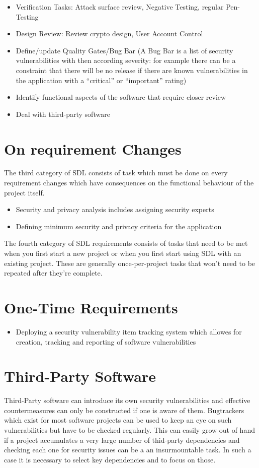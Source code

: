 \begin{itemize}
	\item Verification Tasks: Attack surface review, Negative Testing, regular Pen-Testing
	\item Design Review: Review crypto design, User Account Control
	\item Define/update Quality Gates/Bug Bar (A Bug Bar is a list of security vulnerabilities with then according severity: for example there can be a constraint that there will be no release if there are known vulnerabilities in the application with a ``critical'' or ``important'' rating)
	\item Identify functional aspects of the software that require closer review
	\item Deal with third-party software
\end{itemize}

\section{On requirement Changes}

The third category of SDL consists of task which must be done on every requirement changes which have consequences on the functional behaviour of the project itself. 

\begin{itemize}
	\item Security and privacy analysis includes assigning security experts
	\item Defining minimum security and privacy criteria for the application
\end{itemize}

The fourth category of SDL requirements consists of tasks that need to be met when you first start a new project or when you first start using SDL with an existing project. These are generally once-per-project tasks that won’t need to be repeated after they’re complete.

\section{One-Time Requirements}
\begin{itemize}
	\item Deploying a security vulnerability item tracking system which allowes for creation, tracking and reporting of software vulnerabilities
\end{itemize}

\section{Third-Party Software}
Third-Party software can introduce its own security vulnerabilities and effective countermeasures can only be constructed if one is aware of them. Bugtrackers which exist for most software projects can be used to keep an eye on such vulnerabilities but have to be checked regularly. This can easily grow out of hand if a project accumulates a very large number of thid-party dependencies and checking each one for security issues can be a an insurmountable task. In such a case it is necessary to select key dependencies and to focus on those.

